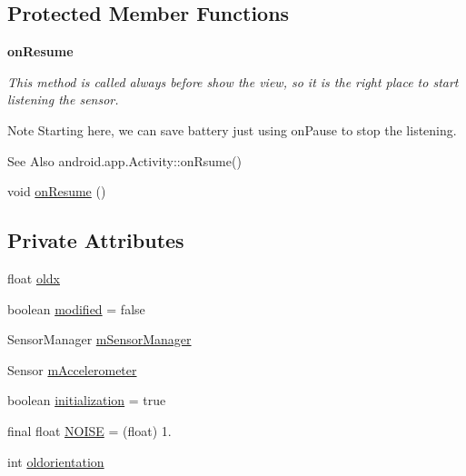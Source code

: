 \subsection*{Protected Member Functions}
\begin{Indent}{\bf on\-Resume}\par
{\em This method is called always before show the view, so it is the right place to start listening the sensor.

\begin{DoxyNote}{Note}
Starting here, we can save battery just using on\-Pause to stop the listening.
\end{DoxyNote}
\begin{DoxySeeAlso}{See Also}
android.\-app.\-Activity\-::on\-Rsume() 
\end{DoxySeeAlso}
}\begin{DoxyCompactItemize}
\item 
void \hyperlink{classnpi_1_1practicaandroid_1_1tutorialnpi_1_1_accelerometer_af1ecce3c0b53a9d08beaa4aaf5f6c9f8}{on\-Resume} ()
\end{DoxyCompactItemize}
\end{Indent}
\subsection*{Private Attributes}
\begin{DoxyCompactItemize}
\item 
float \hyperlink{classnpi_1_1practicaandroid_1_1tutorialnpi_1_1_accelerometer_adeab08257cb4a687507a01ed9f4a38b6}{oldx}
\item 
boolean \hyperlink{classnpi_1_1practicaandroid_1_1tutorialnpi_1_1_accelerometer_a525132490dab752030175fe7bf6fd4c4}{modified} = false
\item 
Sensor\-Manager \hyperlink{classnpi_1_1practicaandroid_1_1tutorialnpi_1_1_accelerometer_a3f322f5b38bcf2cdd0632a5761e8b561}{m\-Sensor\-Manager}
\item 
Sensor \hyperlink{classnpi_1_1practicaandroid_1_1tutorialnpi_1_1_accelerometer_ae5d3a5141d3abe2026f24f948b6a220a}{m\-Accelerometer}
\item 
boolean \hyperlink{classnpi_1_1practicaandroid_1_1tutorialnpi_1_1_accelerometer_a940cba9dcf2a5bd11cbaad56161d85dc}{initialization} = true
\item 
final float \hyperlink{classnpi_1_1practicaandroid_1_1tutorialnpi_1_1_accelerometer_a1bfd98ab9d7bf8fc65bbd8454f7c7625}{N\-O\-I\-S\-E} = (float) 1.
\item 
int \hyperlink{classnpi_1_1practicaandroid_1_1tutorialnpi_1_1_accelerometer_aa60b6921ce35928d28da993573e001d3}{oldorientation}
\end{DoxyCompactItemize}
